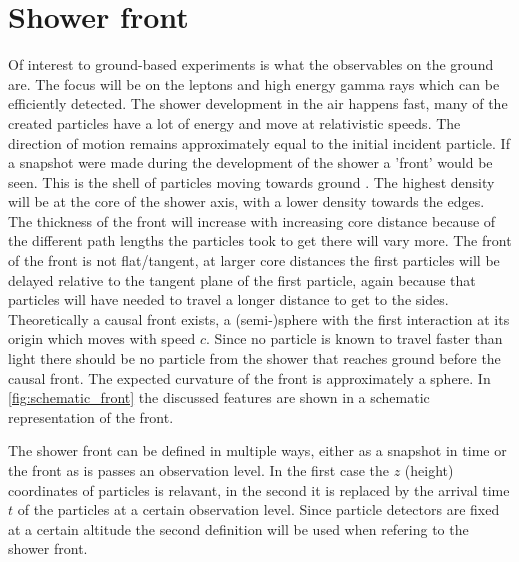 \section{Shower front}


Of interest to ground-based experiments is what the observables on the ground are. The focus will be on the leptons and high energy gamma rays which can be efficiently detected. The shower development in the air happens fast, many of the created particles have a lot of energy and move at relativistic speeds. The direction of motion remains approximately equal to the initial incident particle. If a snapshot were made during the development of the shower a 'front' would be seen. This is the shell of particles moving towards ground \cite{drescher2006eas}. The highest density will be at the core of the shower axis, with a lower density towards the edges. The thickness of the front will increase with increasing core distance because of the different path lengths the particles took to get there will vary more. The front of the front is not flat/tangent, at larger core distances the first particles will be delayed relative to the tangent plane of the first particle, again because that particles will have needed to travel a longer distance to get to the sides. Theoretically a causal front exists, a (semi-)sphere with the first interaction at its origin which moves with speed $c$. Since no particle is known to travel faster than light there should be no particle from the shower that reaches ground before the causal front. The expected curvature of the front is approximately a sphere. In \cref{fig:schematic_front} the discussed features are shown in a schematic representation of the front.

The shower front can be defined in multiple ways, either as a snapshot in time or the front as is passes an observation level. In the first case the $z$ (height) coordinates of particles is relavant, in the second it is replaced by the arrival time $t$ of the particles at a certain observation level. Since particle detectors are fixed at a certain altitude the second definition will be used when refering to the shower front.

